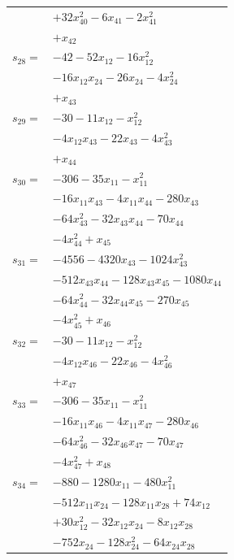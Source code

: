 \begin{longtable}{@{}r@{\;}l@{}}
 & \(\displaystyle +32x_{40}^{2} -6x_{41} -2x_{41}^{2}\) \\
 & \(\displaystyle +x_{42}\) \\[3pt]
\(s_{28}=\) & \(\displaystyle -42 -52x_{12} -16x_{12}^{2}\) \\
 & \(\displaystyle -16x_{12}x_{24} -26x_{24} -4x_{24}^{2}\) \\
 & \(\displaystyle +x_{43}\) \\[3pt]
\(s_{29}=\) & \(\displaystyle -30 -11x_{12} -x_{12}^{2}\) \\
 & \(\displaystyle -4x_{12}x_{43} -22x_{43} -4x_{43}^{2}\) \\
 & \(\displaystyle +x_{44}\) \\[3pt]
\(s_{30}=\) & \(\displaystyle -306 -35x_{11} -x_{11}^{2}\) \\
 & \(\displaystyle -16x_{11}x_{43} -4x_{11}x_{44} -280x_{43}\) \\
 & \(\displaystyle -64x_{43}^{2} -32x_{43}x_{44} -70x_{44}\) \\
 & \(\displaystyle -4x_{44}^{2} +x_{45}\) \\[3pt]
\(s_{31}=\) & \(\displaystyle -4556 -4320x_{43} -1024x_{43}^{2}\) \\
 & \(\displaystyle -512x_{43}x_{44} -128x_{43}x_{45} -1080x_{44}\) \\
 & \(\displaystyle -64x_{44}^{2} -32x_{44}x_{45} -270x_{45}\) \\
 & \(\displaystyle -4x_{45}^{2} +x_{46}\) \\[3pt]
\(s_{32}=\) & \(\displaystyle -30 -11x_{12} -x_{12}^{2}\) \\
 & \(\displaystyle -4x_{12}x_{46} -22x_{46} -4x_{46}^{2}\) \\
 & \(\displaystyle +x_{47}\) \\[3pt]
\(s_{33}=\) & \(\displaystyle -306 -35x_{11} -x_{11}^{2}\) \\
 & \(\displaystyle -16x_{11}x_{46} -4x_{11}x_{47} -280x_{46}\) \\
 & \(\displaystyle -64x_{46}^{2} -32x_{46}x_{47} -70x_{47}\) \\
 & \(\displaystyle -4x_{47}^{2} +x_{48}\) \\[3pt]
\(s_{34}=\) & \(\displaystyle -880 -1280x_{11} -480x_{11}^{2}\) \\
 & \(\displaystyle -512x_{11}x_{24} -128x_{11}x_{28} +74x_{12}\) \\
 & \(\displaystyle +30x_{12}^{2} -32x_{12}x_{24} -8x_{12}x_{28}\) \\
 & \(\displaystyle -752x_{24} -128x_{24}^{2} -64x_{24}x_{28}\) \\

\end{longtable}
